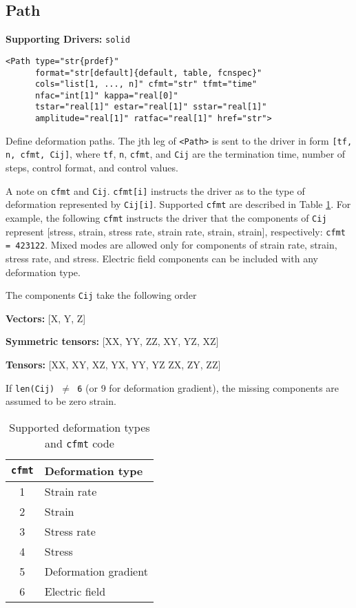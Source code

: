 \documentclass[11pt]{report}
\newcommand{\tag}[1]{\texttt{<#1>}}
\newcommand{\supporting}[1]{\textbf{Supporting Drivers: }\texttt{#1}}
\begin{document}
\subsection{Path}
\supporting{solid}
\begin{verbatim}
<Path type="str{prdef}"
      format="str[default]{default, table, fcnspec}"
      cols="list[1, ..., n]" cfmt="str" tfmt="time"
      nfac="int[1]" kappa="real[0]"
      tstar="real[1]" estar="real[1]" sstar="real[1]"
      amplitude="real[1]" ratfac="real[1]" href="str">
\end{verbatim}
%
Define deformation paths. The jth leg of \tag{Path} is sent to the driver in
form \texttt{[tf, n, cfmt, Cij]}, where \texttt{tf}, \texttt{n},
\texttt{cfmt}, and \texttt{Cij} are the termination time, number of steps,
control format, and control values.

A note on \texttt{cfmt} and \texttt{Cij}. \texttt{cfmt[i]} instructs the
driver as to the type of deformation represented by \texttt{Cij[i]}. Supported
\texttt{cfmt} are described in Table \ref{tab:cfmt}. For example, the
following \texttt{cfmt} instructs the driver that the components of
\texttt{Cij} represent [stress, strain, stress rate, strain rate, strain,
strain], respectively: \texttt{cfmt = 423122}.  Mixed modes are allowed only
for components of strain rate, strain, stress rate, and stress.  Electric
field components can be included with any deformation type.

The components \texttt{Cij} take the following order

\textbf{Vectors:} [X, Y, Z]

\textbf{Symmetric tensors:} [XX, YY, ZZ, XY, YZ, XZ]

\textbf{Tensors:} [XX, XY, XZ, YX, YY, YZ ZX, ZY, ZZ]

If \texttt{len(Cij) $\neq$ 6} (or 9 for deformation gradient), the missing
components are assumed to be zero strain.

\begin{table}[h!]
  \centering
  \begin{tabular}[h]{cl}
    \hline
    \hline
    \texttt{cfmt} & Deformation type \\
    \hline
    1 & Strain rate \\
    2 & Strain \\
    3 & Stress rate \\
    4 & Stress \\
    5 & Deformation gradient \\
    6 & Electric field
  \end{tabular}
  \caption{Supported deformation types and \texttt{cfmt} code}
  \label{tab:cfmt}
\end{table}
\end{document}
